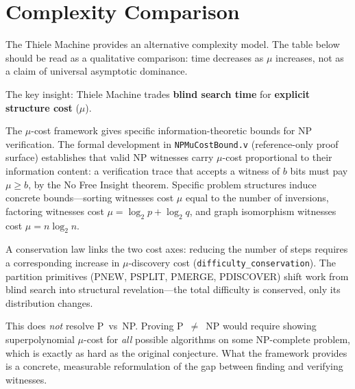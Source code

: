 \section{Complexity Comparison}

The Thiele Machine provides an alternative complexity model. The table below should be read as a qualitative comparison: time decreases as $\mu$ increases, not as a claim of universal asymptotic dominance.

\begin{center}
\end{center}

The key insight: Thiele Machine trades \textbf{blind search time} for \textbf{explicit structure cost} ($\mu$).

The $\mu$-cost framework gives specific information-theoretic bounds for NP verification. The formal development in \texttt{NPMuCostBound.v} (reference-only proof surface) establishes that valid NP witnesses carry $\mu$-cost proportional to their information content: a verification trace that accepts a witness of $b$ bits must pay $\mu \geq b$, by the No Free Insight theorem. Specific problem structures induce concrete bounds---sorting witnesses cost $\mu$ equal to the number of inversions, factoring witnesses cost $\mu = \log_2 p + \log_2 q$, and graph isomorphism witnesses cost $\mu = n \log_2 n$.

A conservation law links the two cost axes: reducing the number of steps requires a corresponding increase in $\mu$-discovery cost (\texttt{difficulty\_conservation}). The partition primitives (PNEW, PSPLIT, PMERGE, PDISCOVER) shift work from blind search into structural revelation---the total difficulty is conserved, only its distribution changes.

This does \textit{not} resolve P~vs~NP. Proving P~$\neq$~NP would require showing superpolynomial $\mu$-cost for \textit{all} possible algorithms on some NP-complete problem, which is exactly as hard as the original conjecture. What the framework provides is a concrete, measurable reformulation of the gap between finding and verifying witnesses.

